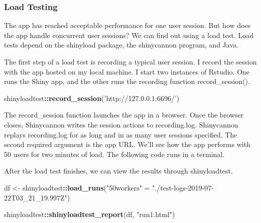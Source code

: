 \documentclass[]{article}
\newenvironment{Shaded}{\begin{snugshade}}{\end{snugshade}}
\newcommand{\ExtensionTok}[1]{#1}
\newcommand{\KeywordTok}[1]{\textcolor[rgb]{0.13,0.29,0.53}{\textbf{#1}}}
\newcommand{\NormalTok}[1]{#1}
\newcommand{\OperatorTok}[1]{\textcolor[rgb]{0.81,0.36,0.00}{\textbf{#1}}}
\newcommand{\StringTok}[1]{\textcolor[rgb]{0.31,0.60,0.02}{#1}}
\begin{document}
\hypertarget{load-testing}{%
\subsubsection{Load Testing}\label{load-testing}}

The app has reached acceptable performance for one user session. But how
does the app handle concurrent user sessions? We can find out using a
load test. Load tests depend on the shinyload package, the shinycannon
program, and Java.

The first step of a load test is recording a typical user session. I
record the session with the app hosted on my local machine. I start two
instances of Rstudio. One runs the Shiny app, and the other runs the
recording function record\_session().

\begin{Shaded}
\begin{Highlighting}[]
\NormalTok{shinyloadtest}\OperatorTok{::}\KeywordTok{record_session}\NormalTok{(}\StringTok{'http://127.0.0.1:6696/'}\NormalTok{)}
\end{Highlighting}
\end{Shaded}

The record\_session function launches the app in a browser. Once the
browser closes, Shinycannon writes the session actions to recording.log.
Shinycannon replays recording.log for as long and in as many user
sessions specified. The second required argument is the app URL. We'll
see how the app performs with 50 users for two minutes of load. The
following code runs in a terminal.

\begin{Shaded}
\end{Shaded}

After the load test finishes, we can view the results through
shinyloadtest.

\begin{Shaded}
\begin{Highlighting}[]
\NormalTok{df <-}\StringTok{ }\NormalTok{shinyloadtest}\OperatorTok{::}\KeywordTok{load_runs}\NormalTok{(}\StringTok{"50workers"}\NormalTok{ =}\StringTok{ "./test-logs-2019-07-22T03_21_19.997Z"}\NormalTok{)}

\NormalTok{shinyloadtest}\OperatorTok{::}\KeywordTok{shinyloadtest_report}\NormalTok{(df, }\StringTok{"run1.html"}\NormalTok{)}
\end{Highlighting}
\end{Shaded}
\end{document}
